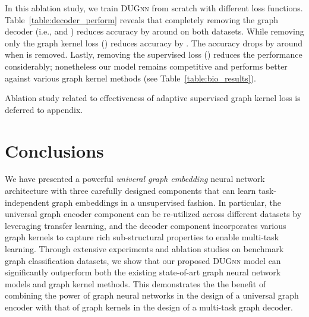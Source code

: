 \documentclass{article}
\begin{document}
In this ablation study,  we train \textsc{DUGnn} from scratch  with different loss functions.  Table~\ref{table:decoder_perform} reveals that completely removing the  graph decoder (i.e.,   and ) reduces accuracy by around  on both datasets. While removing only the graph kernel loss () reduces accuracy by . The accuracy drops by around  when  is removed. Lastly, removing the supervised loss ()     reduces the performance considerably; nonetheless our model remains competitive and performs better against various graph kernel methods (see Table~\ref{table:bio_results}).


Ablation study related to effectiveness of adaptive supervised graph kernel loss is deferred to appendix.


























 


\section{Conclusions}\label{sec:conclusion}

We have presented a   powerful {\em univeral graph embedding} neural network  architecture with three carefully designed components that can learn task-independent graph embeddings in a unsupervised fashion. In particular, the universal graph encoder component can be re-utilized across different datasets by leveraging transfer learning, and the  decoder component incorporates various  graph kernels to  capture   rich sub-structural properties to enable multi-task learning. 
Through extensive experiments and ablation studies on benchmark  graph classification datasets, we show that our proposed \textsc{DUGnn}  model can significantly outperform both the existing state-of-art graph neural network models and graph kernel methods. This demonstrates the  
the benefit of combining the power of graph neural networks in the design of a universal graph encoder with that of graph kernels in the design of a multi-task graph decoder. 
\end{document}
